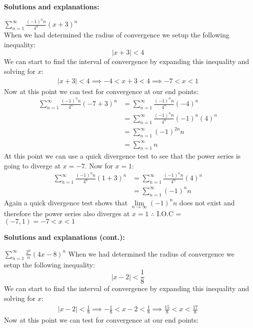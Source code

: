 \documentclass[addpoints]{exam}
\begin{document}
\large \textbf{Solutions and explanations:} \\
\begin{questions}
    \question \(\displaystyle
    \sum\limits_{n = 1}^\infty  {\frac{{{{\left( { - 1} \right)}^n}n}}{{{4^n}}}{{\left( {x + 3} \right)}^n}}
    \) \\
    When we had determined the radius of convergence we setup the following inequality:
    \[
    \left|x+3\right| < 4
    \]
    We can start to find the interval of convergence by expanding this inequality and solving for $x$:
    \begin{align*}
         \left|x+3\right| < 4 
         \implies -4 < x + 3 < 4
         \implies -7 < x < 1
    \end{align*}
    Now at this point we can test for convergence at our end points:
    \begin{align*}
        \sum\limits_{n=1}^\infty \frac{\left(-1\right)^{n}n}{4^n}\left({-7+3}\right)^n 
        & = \sum\limits_{n=1}^\infty \frac{\left(-1\right)^{n}n}{4^n}\left(-4\right)^n \\
        & = \sum\limits_{n=1}^\infty \frac{\left(-1\right)^{n}n}{4^n}\left(-1\right)^n\left(4\right)^n \\
        & = \sum\limits_{n=1}^\infty \left(-1\right)^{2n}n \\
        & = \sum\limits_{n=1}^\infty n
    \end{align*}
    At this point we can use a quick divergence test to see that the power series is going to diverge at $x=-7$. Now for $x=1$: 
    \begin{align*}
        \sum\limits_{n=1}^\infty \frac{\left(-1\right)^{n}n}{4^n}\left(1+3\right)^n
        & = \sum\limits_{n=1}^\infty \frac{\left(-1\right)^{n}n}{4^n}\left(4\right)^n \\
        & = \sum\limits_{n=1}^\infty \left(-1\right)^{n}n
    \end{align*}
    Again a quick divergence test shows that \(\mathop{\lim}\limits_{n\to\infty} \left(-1\right)^{n}n\) does not exist and therefore the power series also diverges at $x=1$ $\therefore$ I.O.C = $(-7, 1) = -7 < x < 1$
    
    \newpage
    \large \textbf{Solutions and explanations (cont.):} 
    
    \question \(\displaystyle
   \sum\limits_{n = 1}^\infty  {\frac{{{2^n}}}{n}{{\left( {4x - 8} \right)}^n}} 
    \)
    When we had determined the radius of convergence we setup the following inequality:
    \[
    \left|x-2\right| < \frac{1}{8}
    \]
    We can start to find the interval of convergence by expanding this inequality and solving for $x$:
    \begin{align*}
         \left|x-2\right| < \frac{1}{8} 
         \implies -\frac{1}{8} < x - 2 < \frac{1}{8}
         \implies \frac{15}{8} < x < \frac{17}{8}
    \end{align*}
    Now at this point we can test for convergence at our end points:


\end{questions}
\end{document}
